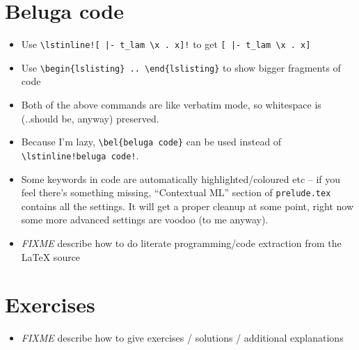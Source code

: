 \documentclass[12pt]{article}
\begin{document}
\section{Beluga code}
\begin{itemize}
\item Use \verb#\lstinline![ |- t_lam \x . x]!# to get \lstinline![ |- t_lam \x . x]!
\item Use \verb#\begin{lslisting} .. \end{lslisting}# to show bigger fragments of \beluga code
\item Both of the above commands are like verbatim mode, so whitespace is (..should be, anyway) preserved.
\item Because I'm lazy, \verb#\bel{beluga code}# can be used instead of \\
\verb#\lstinline!beluga code!#.
\item Some keywords in \beluga code are automatically highlighted/coloured etc -- if you feel there's something missing, ``Contextual ML'' section of \verb#prelude.tex# contains all the settings. It will get a proper cleanup at some point, right now some more advanced settings are voodoo (to me anyway).
\item \emph{FIXME} describe how to do literate programming/code extraction from the LaTeX source
\end{itemize}

\section{Exercises}
\begin{itemize}
\item \emph{FIXME} describe how to give exercises / solutions / additional explanations
\end{itemize}
\end{document}
